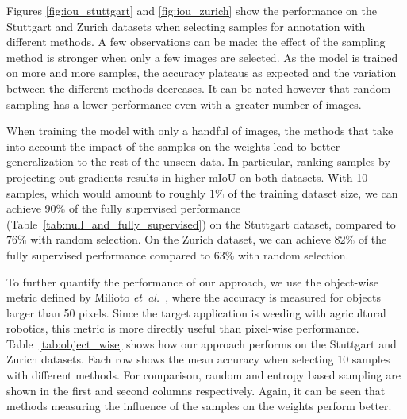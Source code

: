 \documentclass[letterpaper, 10 pt, conference]{ieeeconf}  %
\newcommand\etal{\emph{et~al.}}
\begin{document}
    
Figures \ref{fig:iou_stuttgart} and \ref{fig:iou_zurich} show the performance on the Stuttgart and Zurich datasets when selecting samples for annotation with different methods.  
A few observations can be made: the effect of the sampling method is stronger when only a few images are selected. As the model is trained on more and more samples, the accuracy plateaus as expected and the variation between the different methods decreases. It can be noted however that random sampling has a lower performance even with a greater number of images.

When training the model with only a handful of images, the methods that take into account the impact of the samples on the weights lead to better generalization to the rest of the unseen data. In particular, ranking samples by projecting out gradients results in higher mIoU on both datasets. With 10 samples, which would amount to roughly $1\%$ of the training dataset size, we can achieve $90\%$ of the fully supervised performance (Table~\ref{tab:null_and_fully_supervised}) on the Stuttgart dataset, compared to $76\%$ with random selection. On the Zurich dataset, we can achieve $82\%$ of the fully supervised performance compared to $63\%$ with random selection.


To further quantify the performance of our approach, we use the object-wise metric defined by Milioto \etal~\cite{milioto2018real}, where the accuracy is measured for objects larger than 50 pixels. Since the target application is weeding with agricultural robotics, this metric is more directly useful than pixel-wise performance.  
Table~\ref{tab:object_wise} shows how our approach performs on the Stuttgart and Zurich datasets. Each row shows the mean accuracy when selecting 10 samples with different methods. For comparison, random and entropy based sampling are shown in the first and second columns respectively. Again, it can be seen that methods measuring the influence of the samples on the weights perform better.
\end{document}
